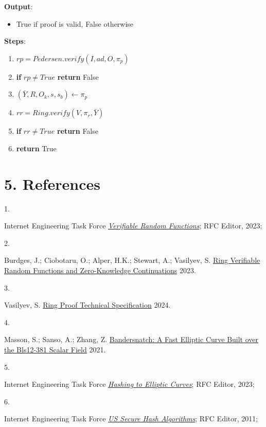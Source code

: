 \documentclass[
]{article}
\providecommand{\tightlist}{%
  \setlength{\itemsep}{0pt}\setlength{\parskip}{0pt}}
\newlength{\cslhangindent}
\newlength{\csllabelwidth}
\newlength{\cslentryspacingunit} %
\newenvironment{CSLReferences}[2] %
 {%
  \setlength{\parindent}{0pt}
  \ifodd #1
  \let\oldpar\par
  \def\par{\hangindent=\cslhangindent\oldpar}
  \fi
  \setlength{\parskip}{#2\cslentryspacingunit}
 }%
 {}
\newcommand{\CSLLeftMargin}[1]{\parbox[t]{\csllabelwidth}{#1}}
\newcommand{\CSLRightInline}[1]{\parbox[t]{\linewidth - \csllabelwidth}{#1}\break}
\begin{document}
\textbf{Output}:

\begin{itemize}
\tightlist
\item
  True if proof is valid, False otherwise
\end{itemize}

\textbf{Steps}:

\begin{enumerate}
\def\labelenumi{\arabic{enumi}.}
\tightlist
\item
  \(rp = Pedersen.verify(I, ad, O, \pi_p)\)
\item
  \textbf{if} \(rp \neq True\) \textbf{return} False
\item
  \((\bar{Y}, R, O_k, s, s_b) \leftarrow \pi_p\)
\item
  \(rr = Ring.verify(V, \pi_r, \bar{Y})\)
\item
  \textbf{if} \(rr \neq True\) \textbf{return} False
\item
  \textbf{return} True
\end{enumerate}

\hypertarget{references}{%
\section*{5. References}\label{references}}

\hypertarget{refs}{}
\begin{CSLReferences}{0}{0}
\leavevmode{}%
\CSLLeftMargin{1. }
\CSLRightInline{Internet Engineering Task Force
\emph{\href{https://datatracker.ietf.org/doc/rfc9381}{{Verifiable Random
Functions}}}; {RFC Editor}, 2023;}

\leavevmode{}%
\CSLLeftMargin{2. }
\CSLRightInline{Burdges, J.; Ciobotaru, O.; Alper, H.K.; Stewart, A.;
Vasilyev, S. \href{https://eprint.iacr.org/2023/002}{Ring Verifiable
Random Functions and Zero-Knowledge Continuations} 2023.}

\leavevmode{}%
\CSLLeftMargin{3. }
\CSLRightInline{Vasilyev, S.
\href{https://hackmd.io/ulW5nFFpTwClHsD0kusJAA}{Ring Proof Technical
Specification} 2024.}

\leavevmode{}%
\CSLLeftMargin{4. }
\CSLRightInline{Masson, S.; Sanso, A.; Zhang, Z.
\href{https://eprint.iacr.org/2021/1152}{Bandersnatch: A Fast Elliptic
Curve Built over the Bls12-381 Scalar Field} 2021.}

\leavevmode{}%
\CSLLeftMargin{5. }
\CSLRightInline{Internet Engineering Task Force
\emph{\href{https://datatracker.ietf.org/doc/rfc9380}{{Hashing to
Elliptic Curves}}}; {RFC Editor}, 2023;}

\leavevmode{}%
\CSLLeftMargin{6. }
\CSLRightInline{Internet Engineering Task Force
\emph{\href{https://datatracker.ietf.org/doc/rfc6234}{{US Secure Hash
Algorithms}}}; {RFC Editor}, 2011;}

\end{CSLReferences}
\end{document}
